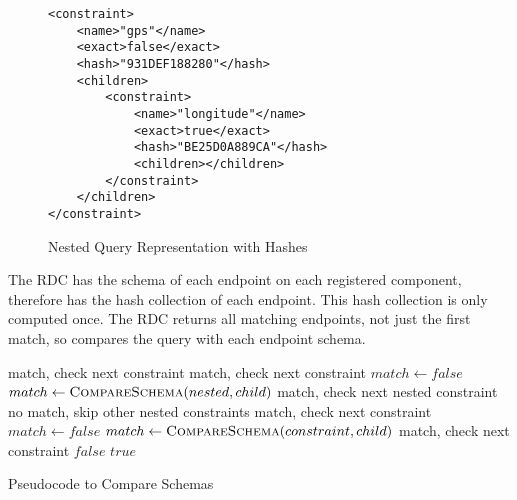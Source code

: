 \documentclass[12pt,twoside,notitlepage]{report}
\begin{document}
\begin{figure}
\begin{lstlisting}
<constraint>
	<name>"gps"</name>
	<exact>false</exact>
	<hash>"931DEF188280"</hash>
	<children>
		<constraint>
			<name>"longitude"</name>
			<exact>true</exact>
			<hash>"BE25D0A889CA"</hash>
			<children></children>
		</constraint>
	</children>
</constraint>
\end{lstlisting}
\caption{Nested Query Representation with Hashes}
\label{fig:nested_query_hash}
\end{figure}

The RDC has the schema of each endpoint on each registered component, therefore has the hash collection of each endpoint. 
This hash collection is only computed once. 
The RDC returns all matching endpoints, not just the first match, so compares the query with each endpoint schema. 

\begin{algorithm}
\begin{algorithmic}[1]
			 \label{alg:line:constraint_exact}
				\Continue \Comment match, check next constraint
				\Continue \Comment match, check next constraint
			\Else \label{alg:line:nested_start}
					\State $match\gets false$
						\State $match\gets \Call{CompareSchema}{nested, child}$
							\Continue \Comment match, check next nested constraint
						\EndIf
					\EndFor
						\Break \Comment no match, skip other nested constraints
					\EndIf
				\EndFor
					\Continue \Comment match, check next constraint
				\EndIf
			\EndIf \label{alg:line:nested_end}
		\Else
			\State $match\gets false$
				\State $match\gets \Call{CompareSchema}{constraint, child}$
					\Continue \Comment match, check next constraint
				\EndIf
			\EndFor
				\State \Return $false$
			\EndIf
		\EndIf
	\EndFor
	\State \Return $true$
\EndFunction 
\end{algorithmic}
\caption{Pseudocode to Compare Schemas}
\label{alg:compare_schema}
\end{algorithm}
\end{document}
